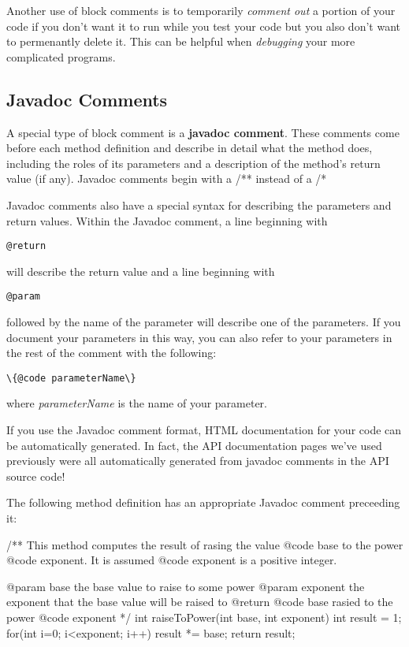 Another use of block comments is to temporarily \textit{comment out} a portion of your code if you don't want it to run while you test your code but you also don't want to permenantly delete it. This can be helpful when \textit{debugging} your more complicated programs. 

\subsection{Javadoc Comments}
A special type of block comment is a \textbf{javadoc comment}. These comments come before each method definition and describe in detail what the method does, including the roles of its parameters and a description of the method's return value (if any). Javadoc comments begin with a /** instead of a /*

Javadoc comments also have a special syntax for describing the parameters and return values. Within the Javadoc comment, a line beginning with \begin{verbatim}@return\end{verbatim} will describe the return value and a line beginning with \begin{verbatim}@param\end{verbatim} followed by the name of the parameter will describe one of the parameters. If you document your parameters in this way, you can also refer to your parameters in the rest of the comment with the following: \begin{verbatim}\{@code parameterName\}\end{verbatim} where \textit{parameterName} is the name of your parameter. 

If you use the Javadoc comment format, HTML documentation for your code can be automatically generated. In fact, the API documentation pages we've used previously were all automatically generated from javadoc comments in the API source code!

\newpage

\begin{exa}
The following method definition has an appropriate Javadoc comment preceeding it:

\begin{code}
/** This method computes the result of rasing the value {@code base} to the power {@code exponent}.
    It is assumed {@code exponent} is a positive integer.
    
    @param base the base value to raise to some power
    @param exponent the exponent that the base value will be raised to
    @return {@code base} rasied to the power {@code exponent}
*/
int raiseToPower(int base, int exponent) {
  int result = 1;
  for(int i=0; i<exponent; i++) { 
    result *= base;
  } 
  return result;
}
\end{code}
\end{exa}

